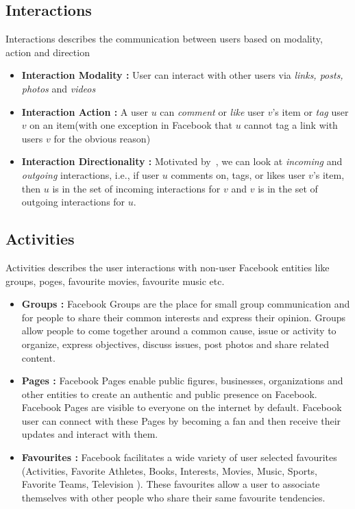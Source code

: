 \subsection{Interactions}
Interactions describes the communication between users based on modality, action and direction
\begin{itemize}
\item \textbf{Interaction Modality :}  User can interact with other users via
									 \textit{links, posts, photos} and \textit{videos}
\item \textbf{Interaction Action :}  A user $u$ can \textit{comment} or \textit{like} 
									user $v$'s item or \textit{tag} user $v$ on an 
									item(with one exception in Facebook that $u$ cannot tag a 
									link with users $v$ for the obvious reason) 
\item \textbf{Interaction Directionality :} Motivated by~\cite{saez2011high}, we can look
      								at \textit{incoming} and \textit{outgoing} interactions, i.e.,
      								if user $u$ comments on, tags, or likes user $v$'s item,
      								then $u$ is in the set of incoming interactions for $v$
      								and $v$ is in the set of outgoing interactions for $u$.
      								
\end{itemize}								

\subsection{Activities}
Activities describes the user interactions with non-user Facebook entities like groups, poges, favourite movies, favourite music etc.
\begin{itemize}
  \item \textbf{Groups :} Facebook Groups are the place for small group communication and for people to share their common interests 
  						and express their opinion. Groups allow people to come together around a common cause, issue or activity to
  						organize, express objectives, discuss issues, post photos and share related content.
  \item \textbf{Pages :}  Facebook Pages enable public figures, businesses, organizations and other entities to create an authentic 
  						and public presence on Facebook. Facebook Pages are visible to everyone on the internet 
  						by default. Facebook user can connect with these Pages by becoming a fan and then receive their updates and interact with them.
  \item \textbf{Favourites :} Facebook facilitates a wide variety of user selected favourites (Activities, Favorite Athletes, Books, Interests, Movies, Music, Sports, Favorite Teams, Television ). These favourites allow
							a user to associate themselves with other people who share their same favourite tendencies.
\end{itemize} 
 

